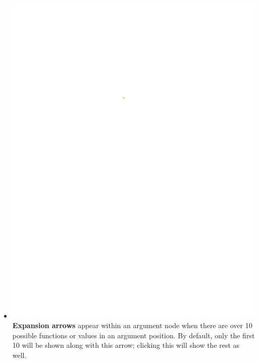 \documentclass[conference]{IEEEtran}
\begin{document}
\begin{itemize}
		\item  \vspace{.25cm} \includegraphics{glossary-arrow} \textbf{Expansion
			arrows} appear within an argument node when there are over 10 possible
		functions or values in an argument position. By default, only the first 10
		will be shown along with this arrow; clicking this will show the rest as well.
		

\end{itemize}
\end{document}
